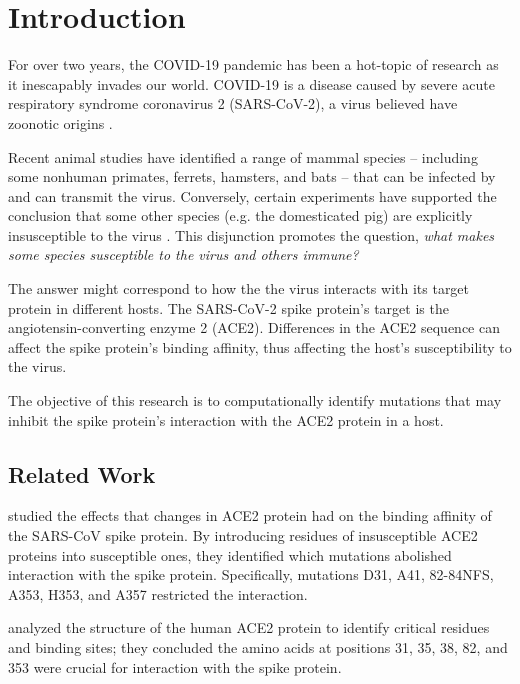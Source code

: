 \newpage
\section{Introduction}

For over two years, the COVID-19 pandemic has been a hot-topic of research as it inescapably invades our world. COVID-19 is a disease caused by severe acute respiratory syndrome coronavirus 2 (SARS-CoV-2), a virus believed have zoonotic origins \cite{Andersen}.

Recent animal studies have identified a range of mammal species -- including some nonhuman primates, ferrets, hamsters, and bats \cite{Oude} -- that can be infected by and can transmit the virus. Conversely, certain experiments have supported the conclusion that some other species (e.g. the domesticated pig) are explicitly insusceptible to the virus \cite{Oude}\cite{Sreenivasan}. This disjunction promotes the question, \emph{what makes some species susceptible to the virus and others immune?}

The answer might correspond to how the the virus interacts with its target protein in different hosts. The SARS-CoV-2 spike protein's target is the angiotensin-converting enzyme 2 (ACE2). Differences in the ACE2 sequence can affect the spike protein's binding affinity, thus affecting the host's susceptibility to the virus.

The objective of this research is to computationally identify mutations that may inhibit the spike protein's interaction with the ACE2 protein in a host.

\subsection{Related Work}

\textcite{Li} studied the effects that changes in ACE2 protein had on the binding affinity of the SARS-CoV spike protein. By introducing residues of insusceptible ACE2 proteins into susceptible ones, they identified which mutations abolished interaction with the spike protein. Specifically, mutations D31, A41, 82-84NFS, A353, H353, and A357 restricted the interaction.

\textcite{Liu} analyzed the structure of the human ACE2 protein to identify critical residues and binding sites; they concluded the amino acids at positions 31, 35, 38, 82, and 353 were crucial for interaction with the spike protein.